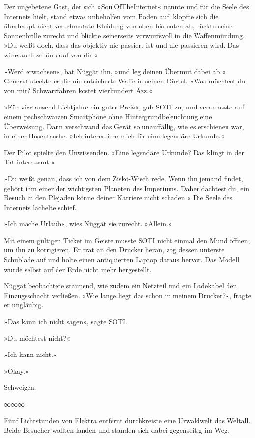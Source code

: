 Der ungebetene Gast, der sich »SoulOfTheInternet« nannte und für die Seele des Internets hielt, stand etwas unbeholfen vom Boden auf, klopfte sich die überhaupt nicht verschmutzte Kleidung von oben bis unten ab, rückte seine Sonnenbrille zurecht und blickte seinerseits vorwurfsvoll in die Waffenmündung. »Du weißt doch, dass das objektiv nie passiert ist und nie passieren wird. Das wäre auch schön doof von dir.«

»Werd erwachsen«, bat Nüggät ihn, »und leg deinen Übermut dabei ab.« Genervt steckte er die nie entsicherte Waffe in seinen Gürtel. »Was möchtest du von mir? Schwarzfahren kostet vierhundert Äzz.«

»Für viertausend Lichtjahre ein guter Preis«, gab SOTI zu, und veranlasste auf einem pechschwarzen Smartphone ohne Hintergrundbeleuchtung eine Überweisung. Dann verschwand das Gerät so unauffällig, wie es erschienen war, in einer Hosentasche. »Ich interessiere mich für eine legendäre Urkunde.«

Der Pilot spielte den Unwissenden. »Eine legendäre Urkunde? Das klingt in der Tat interessant.«

»Du weißt genau, dass ich von dem Ziskö-Wisch rede. Wenn ihn jemand findet, gehört ihm einer der wichtigsten Planeten des Imperiums. Daher dachtest du, ein Besuch in den Plejaden könne deiner Karriere nicht schaden.« Die Seele des Internets lächelte schief.

»Ich mache Urlaub«, wies Nüggät sie zurecht. »Allein.«

Mit einem gültigen Ticket im Geiste musste SOTI nicht einmal den Mund öffnen, um ihn zu korrigieren. Er trat an den Drucker heran, zog dessen unterste Schublade auf und holte einen antiquierten Laptop daraus hervor. Das Modell wurde selbst auf der Erde nicht mehr hergestellt.

Nüggät beobachtete staunend, wie zudem ein Netzteil und ein Ladekabel den Einzugsschacht verließen. »Wie lange liegt das schon in meinem Drucker?«, fragte er ungläubig.

»Das kann ich nicht sagen«, sagte SOTI.

»Du möchtest nicht?«

»Ich kann nicht.«

»Okay.«

Schweigen.

\begin{center}
∞∞∞
\end{center}

Fünf Lichtstunden von Elektra entfernt durchkreiste eine Urwaldwelt das Weltall. Beide Besucher wollten landen und standen sich dabei gegenseitig im Weg.

